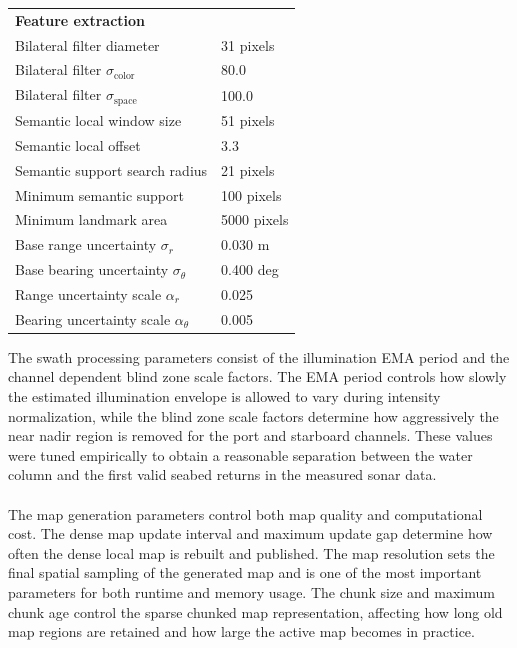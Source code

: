 \begin{table}[H]
\begin{tabular}{l l}
        \multicolumn{2}{l}{\textbf{Feature extraction}} \\
        Bilateral filter diameter & 31 pixels \\
        Bilateral filter $\sigma_{\mathrm{color}}$ & 80.0 \\
        Bilateral filter $\sigma_{\mathrm{space}}$ & 100.0 \\
        Semantic local window size & 51 pixels \\
        Semantic local offset & 3.3 \\
        Semantic support search radius & 21 pixels \\
        Minimum semantic support & 100 pixels \\
        Minimum landmark area & 5000 pixels \\
        Base range uncertainty $\sigma_r$ & 0.030 m \\
        Base bearing uncertainty $\sigma_\theta$ & 0.400 deg \\
        Range uncertainty scale $\alpha_r$ & 0.025 \\
        Bearing uncertainty scale $\alpha_\theta$ & 0.005 \\

        \hline
    \end{tabular}
\end{table}
\noindent
The swath processing parameters consist of the illumination EMA period and the channel dependent blind zone scale factors. The EMA period controls how slowly the estimated illumination envelope is allowed to vary during intensity normalization, while the blind zone scale factors determine how aggressively the near nadir region is removed for the port and starboard channels. These values were tuned empirically to obtain a reasonable separation between the water column and the first valid seabed returns in the measured sonar data.
\\ \\
The map generation parameters control both map quality and computational cost. The dense map update interval and maximum update gap determine how often the dense local map is rebuilt and published. The map resolution sets the final spatial sampling of the generated map and is one of the most important parameters for both runtime and memory usage. The chunk size and maximum chunk age control the sparse chunked map representation, affecting how long old map regions are retained and how large the active map becomes in practice.
\\ \\
